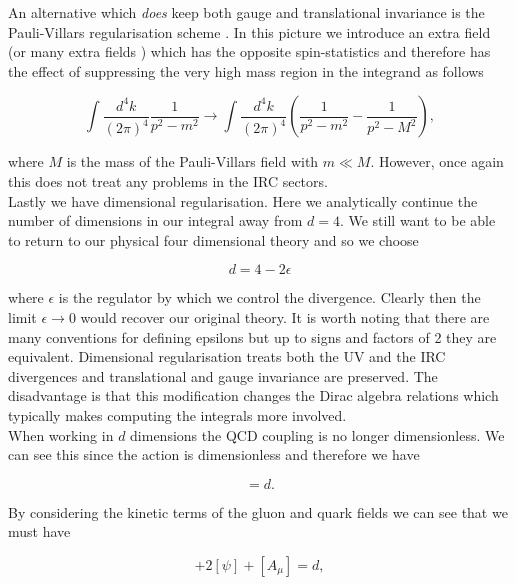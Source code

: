 		An alternative which \emph{does} keep both gauge and translational invariance is the Pauli-Villars
		regularisation scheme \cite{RevModPhys.21.434}.  In this picture we introduce an extra field (or many extra fields
		\cite{FROLOV1993344}) which has the opposite spin-statistics and therefore has the effect of suppressing
		the very high mass region in the integrand as follows

		\begin{equation}
			\int\frac{d^4k}{(2\pi)^4}\frac{1}{p^2-m^2}\rightarrow\int\frac{d^4k}{(2\pi)^4}\left(\frac{1}{p^2-m^2} - \frac{1}{p^2-M^2}\right),
		\end{equation}

		where $M$ is the mass of the Pauli-Villars field with $m\ll M$.  However, once again this does not treat any
		problems in the IRC sectors.  \\Lastly we have dimensional regularisation.  Here we analytically continue the
		number of dimensions in our integral away from $d=4$.  We still want to be able to return to our physical four
		dimensional theory and so we choose

		\begin{equation}
			d=4-2\epsilon
		\end{equation}

		where $\epsilon$ is the regulator by which we control the divergence. Clearly then the limit
		$\epsilon\rightarrow 0$ would recover our original theory.  It is worth noting that there are many
		conventions for defining epsilons but up to signs and factors of 2 they are equivalent. Dimensional
		regularisation treats both the UV and the IRC divergences and translational and gauge invariance are
		preserved.  The disadvantage is that this modification changes the Dirac algebra relations which
		typically makes computing the integrals more involved.\\When working in $d$ dimensions the QCD coupling
		is no longer dimensionless.  We can see this since the action is dimensionless and therefore we have

		\begin{equation}
			[\mathcal{L}] = d.
		\end{equation}

		By considering the kinetic terms of the gluon and quark fields we can see that we must have

		\begin{equation}
			[g] + 2[\psi] + [A_\mu] = d,
		\end{equation}

